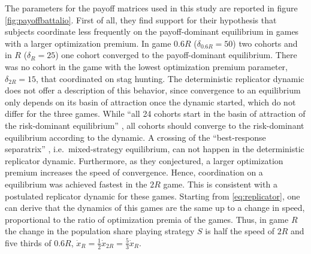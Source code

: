 The parameters for the payoff matrices used in this study 
are reported in figure \ref{fig:payoffbattalio}. 
First of all, they find support for their hypothesis that 
subjects coordinate less frequently on the 
payoff-dominant equilibrium in games with a larger optimization premium. 
In game $0.6R$ ($\delta_{0.6R}=50$) two cohorts and in $R$ ($\delta_{R}=25$)
one cohort converged to the payoff-dominant equilibrium. There was no
cohort in the game with the lowest optimization premium parameter, 
$\delta_{2R}= 15$, that coordinated on stag hunting.
The deterministic replicator dynamic does 
not offer a description of this behavior, since convergence to an 
equilibrium only depends on its basin of attraction once the dynamic 
started, which do not differ for the three games. 
While ``all 24 cohorts start in the basin of attraction
of the risk-dominant equilibrium'' 
\parencite[755]{battalio_optimization_2001}, all cohorts 
should converge to the risk-dominant equilibrium according to the dynamic.
A crossing of the  ``best-response separatrix'' 
\parencite{battalio_optimization_2001}, i.e.\ 
mixed-strategy equilibrium, can not happen in the deterministic replicator 
dynamic. Furthermore, as they conjectured, a larger optimization premium 
increases the speed of convergence. Hence,  coordination on a equilibrium 
was achieved fastest in the $2R$ game. This is consistent with a 
postulated replicator dynamic for these games. Starting from 
\eqref{eq:replicator}, one can derive that the dynamics of this 
games are the same up to a change in speed, proportional to the ratio of 
optimization premia of the games. Thus, in game $R$ the change 
in the population share playing strategy $S$ is half the 
speed of $2R$ and five thirds of $0.6R$,
$\dot{x}_{R} = \frac 12 \dot{x}_{2R} = \frac{5}{3}\dot{x}_R$.


